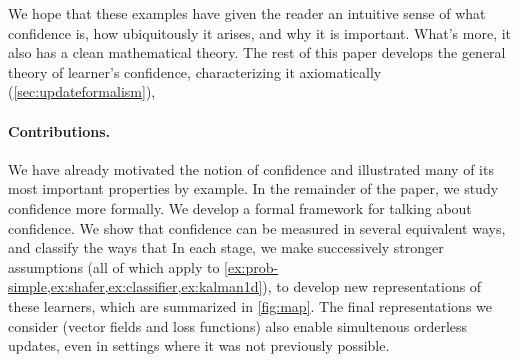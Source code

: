 We hope that these examples have given the reader an intuitive sense of what confidence is, how ubiquitously it arises, and why it is important.
What's more, it also has a clean mathematical theory.
The rest of this paper develops the general theory of learner's confidence,
    characterizing it axiomatically (\cref{sec:updateformalism}), 
	
	

\paragraph{Contributions.}
We have already motivated the notion of confidence and illustrated many of its most important properties by example.
In the remainder of the paper, we study confidence more formally. 
We develop a formal framework for talking about confidence.
We show that confidence can be measured in several equivalent ways, and classify the ways that 
In each stage, we make successively stronger assumptions (all of which apply to \cref{ex:prob-simple,ex:shafer,ex:classifier,ex:kalman1d}), to develop new representations of these learners, 
which are summarized in \cref{fig:map}.
The final representations we consider (vector fields and loss functions) also enable simultenous orderless updates, even in settings where it was not previously possible. 





